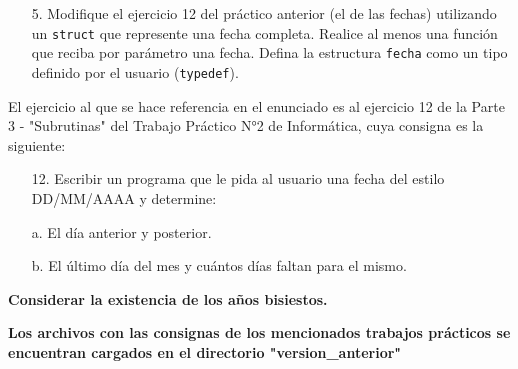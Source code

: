 \documentclass[a4paper,12pt]{article}
\begin{document}
\begin{itemize}
    \item[5.]Modifique el ejercicio 12 del práctico anterior (el de las fechas) utilizando un \texttt{struct} que represente una fecha completa. Realice al menos una función que reciba por parámetro una fecha. Defina la estructura \texttt{fecha} como un tipo definido por el usuario (\texttt{typedef}).
\end{itemize}

El ejercicio al que se hace referencia en el enunciado es al ejercicio 12 de la Parte 3 - "Subrutinas" del Trabajo Práctico N°2 de Informática, cuya consigna es la siguiente:

\begin{itemize}
    \item[12.] Escribir un programa que le pida al usuario una fecha del estilo DD/MM/AAAA y determine:
\end{itemize}
\begin{enumerate}
    \item[a.] El día anterior y posterior.
    \item[b.] El último día del mes y cuántos días faltan para el mismo.
\end{enumerate}

\textbf{Considerar la existencia de los años bisiestos.}
\vspace{1cm}

\textbf{Los archivos con las consignas de los mencionados trabajos prácticos se encuentran cargados en el directorio "version\_anterior"}
\newpage
\end{document}
